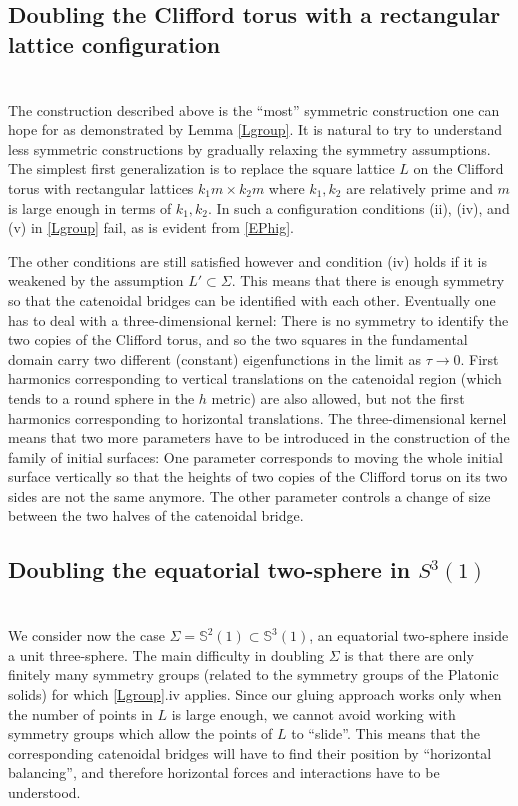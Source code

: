 \documentclass[12pt,namelimits,sumlimits]{amsart}
\theoremstyle{remark}
\numberwithin{equation}{section}
\begin{document}
\subsection*{Doubling the Clifford torus with a rectangular lattice configuration \cite{wiygul}}
$\phantom{ab}$
\nopagebreak

The construction described above is the ``most'' symmetric construction one can hope for
as demonstrated by Lemma \ref{Lgroup}.
It is natural to try to understand less symmetric constructions 
by gradually relaxing the symmetry assumptions.
The simplest first generalization is to replace the square lattice $L$
on the Clifford torus with
rectangular lattices $k_1 m\times k_2 m$ 
where $k_1,k_2$ are relatively prime and 
$m$ is large enough in terms of $k_1,k_2$.
In such a configuration conditions (ii), (iv), and (v) in \ref{Lgroup} fail,
as is evident from \ref{EPhig}.

The other conditions are still satisfied however and condition (iv) holds if it is weakened by
the assumption $L'\subset\Sigma$.
This means that there is enough symmetry so that the catenoidal bridges can be identified with each other.
Eventually one has to deal with a three-dimensional kernel:
There is no symmetry to identify the two copies of the Clifford torus,
and so the two squares in the fundamental domain carry two different (constant)
eigenfunctions in the limit as $\tau\to0$.
First harmonics corresponding to vertical translations on the catenoidal region
(which tends to a round sphere in the $h$ metric) are also allowed,
but not the first harmonics corresponding to horizontal translations.
The three-dimensional kernel means that two more parameters have to be introduced
in the construction of the family of initial surfaces:
One parameter corresponds to moving the whole initial surface vertically
so that the heights of two copies of the Clifford torus on its two sides
are not the same anymore.
The other parameter controls a change of size between the two halves of the catenoidal bridge.

\subsection*{Doubling the equatorial two-sphere in $S^3(1)$ \cite{kapouleas:equator}}
$\phantom{ab}$
\nopagebreak

We consider now the case $\Sigma={\mathbb{S}}^2(1)\subset{\mathbb{S}}^3(1)$,
an equatorial two-sphere inside a unit three-sphere.
The main difficulty in doubling $\Sigma$ is that there are only finitely many symmetry groups
(related to the symmetry groups of the Platonic solids)
for which \ref{Lgroup}.iv applies.
Since our gluing approach works only when the number of points in $L$ is large enough,
we cannot avoid working with symmetry groups which allow the points of $L$ to ``slide''.
This means that the corresponding catenoidal bridges will have to find their position
by ``horizontal balancing'', and therefore horizontal forces and interactions have
to be understood.
\end{document}
